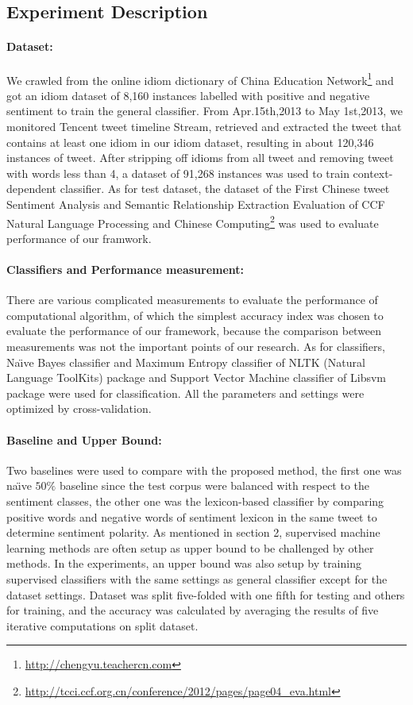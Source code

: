 \documentclass{llncs}
\begin{document}
\subsection{Experiment Description}
\paragraph{Dataset:}
We crawled from the online idiom dictionary of China Education
Network\footnote{\url{http://chengyu.teachercn.com}} and got an idiom dataset of 8,160 instances labelled with positive and negative sentiment to train the general classifier. 
From Apr.15th,2013 to May 1st,2013, we monitored Tencent tweet timeline Stream, retrieved and extracted the tweet that contains at least one idiom in our idiom dataset, resulting in about 120,346 instances of tweet. 
After stripping off idioms from all tweet and removing tweet with words less than 4, a dataset of 91,268 instances was used to train context-dependent classifier. 
As for test dataset, the dataset of the First Chinese tweet Sentiment Analysis and Semantic Relationship Extraction Evaluation of CCF Natural Language Processing and Chinese Computing\footnote{\url{http://tcci.ccf.org.cn/conference/2012/pages/page04_eva.html}} was used to evaluate performance of our framwork.
\paragraph{Classifiers and Performance measurement:}
There are various complicated measurements to evaluate the performance of computational algorithm, of which the simplest accuracy index was chosen to evaluate the performance of our framework, because the comparison between measurements was not the important points of our research. 
As for classifiers, Na\"\i ve Bayes classifier and Maximum Entropy classifier of NLTK (Natural Language ToolKits)\cite{xsongx:b27} package and Support Vector Machine classifier of Libsvm\cite{xsongx:b28} package were used for classification. 
All the parameters and settings were optimized by cross-validation.
\paragraph{Baseline and Upper Bound:}
Two baselines were used to compare with the proposed method, the first one was na\"\i ve $ 50\% $ baseline since the test corpus were balanced with respect to the sentiment classes, the other one was the lexicon-based classifier by comparing positive words and negative words of sentiment lexicon in the same tweet to determine sentiment polarity.
As mentioned in section 2, supervised machine learning methods are often setup as upper bound to be challenged by other methods. 
In the experiments, an upper bound was also setup by training supervised classifiers with the same 
settings as general classifier except for the dataset settings.  
Dataset was split five-folded with one fifth for testing and others for training, and the accuracy was calculated by averaging the results of five iterative computations on split dataset.
\end{document}
